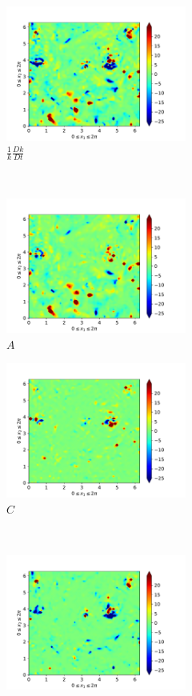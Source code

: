 \begin{figure}[H]
    \begin{subfigure}[H]{0.45\textwidth}
        \includegraphics[height=1.75in]{media/run-cds-65/ke-1420}
        \caption{$\frac{1}{k} \frac{D k}{Dt}$}
    \end{subfigure}
    ~
    \begin{subfigure}{0.45\textwidth}
        \includegraphics[height=1.75in]{media/run-cds-65/A-ke-1420}
        \caption{$A$}
    \end{subfigure}
    \newline
    \begin{subfigure}{0.45\textwidth}
        \includegraphics[height=1.75in]{media/run-cds-65/C-ke-1420}
        \caption{$C$}
    \end{subfigure}
    ~
    \begin{subfigure}{0.45\textwidth}
        \includegraphics[height=1.75in]{media/run-cds-65/P-ke-1420}

\end{subfigure}
\end{figure}
